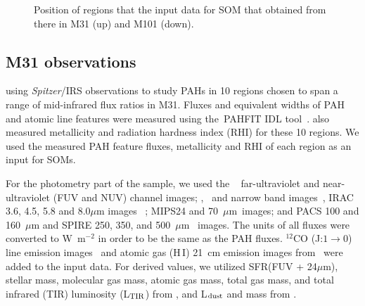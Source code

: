   \begin{figure}
    \hfill
    \caption{Position of regions that the input data for SOM that obtained from there in M31 (up) and M101 (down).}
    \label{fig:dummy}
  \end{figure}

    \subsection{M31 observations}
     \label{Sec: data_M31_SOMN} 
     
     \cite{Dim15} using {\it Spitzer}/IRS observations to study PAHs in 10 regions chosen to span a range of mid-infrared flux ratios in M31. 
     Fluxes and equivalent widths of PAH and atomic line features were measured using the~{\sc PAHFIT IDL} tool~\citep{Smith07b}.
     \cite{Dim15} also measured metallicity and radiation hardness index (RHI) for these 10 regions.
     We used the measured PAH feature fluxes, metallicity and RHI of each region as an input for SOMs.
     
    For the photometry part of the sample, we used the \GALEX~\citep{Martin05} far-ultraviolet and near-ultraviolet (FUV and NUV) channel images; \halpha, \sii~and \oiii narrow band images~\citep{Massey07}, IRAC 3.6, 4.5, 5.8 and 8.0$\mu$m images ~\citep{Barmby06}; MIPS24 and 70~$\mu$m~images\citep{Gordon06}; and PACS 100 and 160~$\mu$m and SPIRE 250, 350, and 500~$\mu$m~\citep{Fritz12} images.
     The units of all fluxes were converted to W~m$^{-2}$ in order to be the same as the PAH fluxes.
     $^{12}$CO (J:$1\rightarrow0$) line emission images~\citep{Nieten06} and atomic gas (H\,{\sc I}) 21~cm emission images from~\cite{Chemin09} were added to the input data. 
     For derived values, we utilized SFR(FUV + 24$\mu$m), stellar mass, molecular gas mass, atomic gas mass, total gas mass, and total infrared (TIR) luminosity (L$_{\rm TIR}$) from \cite{Rahmani16}, and L$_{\rm dust}$ and mass from \cite{Draine14}.
     
